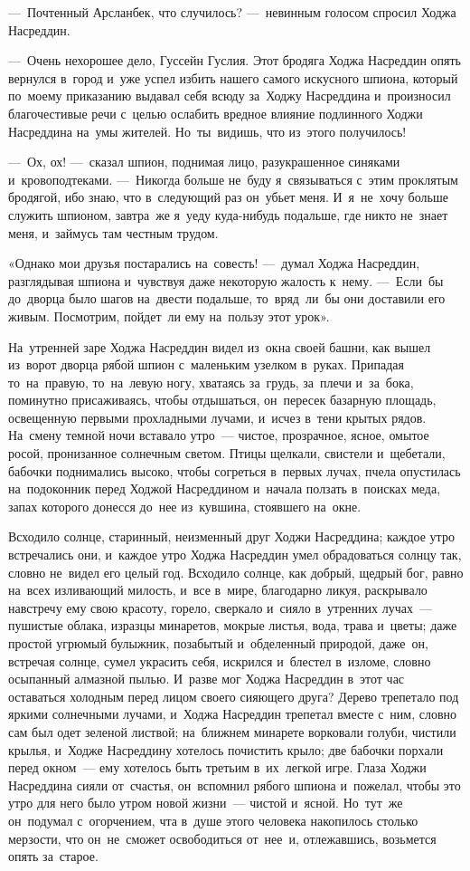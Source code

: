 \documentclass[12pt,a4paper]{book}
\begin{document}
—~Почтенный Арсланбек, что случилось? —~невинным голосом спросил Ходжа Насреддин.

—~Очень нехорошее дело, Гуссейн Гуслия. Этот бродяга Ходжа Насреддин опять вернулся в~город и~уже успел избить нашего самого искусного шпиона, который по~моему приказанию выдавал себя всюду за~Ходжу Насреддина и~произносил благочестивые речи с~целью ослабить вредное влияние подлинного Ходжи Насреддина на~умы жителей. Но~ты~видишь, что из~этого получилось!

—~Ох, ох! —~сказал шпион, поднимая лицо, разукрашенное синяками и~кровоподтеками. —~Никогда больше не~буду я~связываться с~этим проклятым бродягой, ибо знаю, что в~следующий раз он~убьет меня. И~я~не~хочу больше служить шпионом, завтра~же я~уеду куда-нибудь подальше, где никто не~знает меня, и~займусь там честным трудом.

«Однако мои друзья постарались на~совесть! —~думал Ходжа Насреддин, разглядывая шпиона и~чувствуя даже некоторую жалость к~нему. —~Если~бы до~дворца было шагов на~двести подальше, то~вряд~ли~бы они доставили его живым. Посмотрим, пойдет~ли ему на~пользу этот урок».

На~утренней заре Ходжа Насреддин видел из~окна своей башни, как вышел из~ворот дворца рябой шпион с~маленьким узелком в~руках. Припадая то~на~правую, то~на~левую ногу, хватаясь за~грудь, за~плечи и~за~бока, поминутно присаживаясь, чтобы отдышаться, он~пересек базарную площадь, освещенную первыми прохладными лучами, и~исчез в~тени крытых рядов. На~смену темной ночи вставало утро~— чистое, прозрачное, ясное, омытое росой, пронизанное солнечным светом. Птицы щелкали, свистели и~щебетали, бабочки поднимались высоко, чтобы согреться в~первых лучах, пчела опустилась на~подоконник перед Ходжой Насреддином и~начала ползать в~поисках меда, запах которого донесся до~нее из~кувшина, стоявшего на~окне.

Всходило солнце, старинный, неизменный друг Ходжи Насреддина; каждое утро встречались они, и~каждое утро Ходжа Насреддин умел обрадоваться солнцу так, словно не~видел его целый год. Всходило солнце, как добрый, щедрый бог, равно на~всех изливающий милость, и~все в~мире, благодарно ликуя, раскрывало навстречу ему свою красоту, горело, сверкало и~сияло в~утренних лучах~— пушистые облака, изразцы минаретов, мокрые листья, вода, трава и~цветы; даже простой угрюмый булыжник, позабытый и~обделенный природой, даже~он, встречая солнце, сумел украсить себя, искрился и~блестел в~изломе, словно осыпанный алмазной пылью. И~разве мог Ходжа Насреддин в~этот час оставаться холодным перед лицом своего сияющего друга? Дерево трепетало под яркими солнечными лучами, и~Ходжа Насреддин трепетал вместе с~ним, словно сам был одет зеленой листвой; на~ближнем минарете ворковали голуби, чистили крылья, и~Ходже Насреддину хотелось почистить крыло; две бабочки порхали перед окном~— ему хотелось быть третьим в~их~легкой игре. Глаза Ходжи Насреддина сияли от~счастья, он~вспомнил рябого шпиона и~пожелал, чтобы это утро для него было утром новой жизни~— чистой и~ясной. Но~тут~же он~подумал с~огорчением, чта в~душе этого человека накопилось столько мерзости, что он~не~сможет освободиться от~нее~и, отлежавшись, возьмется опять за~старое.
\end{document}
